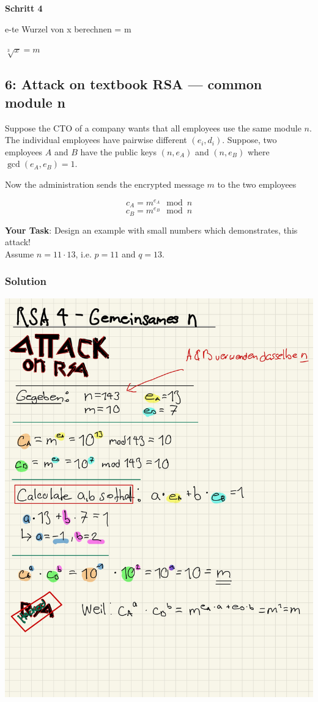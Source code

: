 \documentclass[11pt]{article}
\begin{document}
\textbf{Schritt 4}

e-te Wurzel von x berechnen = m

\(\sqrt[3]{x} = m\)

\newpage

    \hypertarget{attack-on-textbook-rsa-common-module-n}{%
\subsection{6: Attack on textbook RSA --- common module
n}\label{attack-on-textbook-rsa-common-module-n}}

Suppose the CTO of a company wants that all employees use the same
module \(n\). The individual employees have pairwise different
\((e_i , d_i )\). Suppose, two employees \(A\) and \(B\) have the public
keys \((n,e_A)\) and \((n,e_B)\) where \(\gcd(e_A,e_B) = 1\).

Now the administration sends the encrypted message \(m\) to the two
employees

\[c_A = m^{e_A} \mod n \] \[ c_B = m^{e_B} \mod n\]

\textbf{Your Task}: Design an example with small numbers which
demonstrates, this attack!\\
Assume \(n = 11\cdot 13\), i.e. \(p = 11\) and \(q = 13\).

\hypertarget{solution}{%
\subsubsection{Solution}\label{solution}}


\begin{center}
	\includegraphics[scale=0.8]{img/psol5.jpg}
\end{center}
\end{document}
